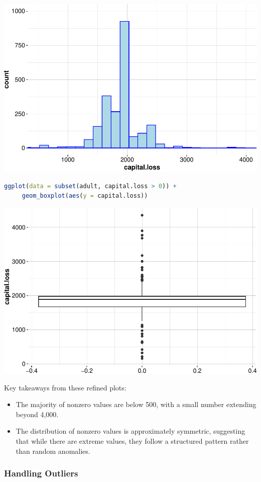 \documentclass[
]{book}
\providecommand{\tightlist}{%
  \setlength{\itemsep}{0pt}\setlength{\parskip}{0pt}}
\theoremstyle{definition}
\theoremstyle{definition}
\theoremstyle{definition}
\theoremstyle{definition}
\theoremstyle{remark}
\begin{document}
\begin{center}\includegraphics[width=0.7\linewidth]{data-preparation_files/figure-latex/unnamed-chunk-28-1} \end{center}

\begin{lstlisting}[language=R]
ggplot(data = subset(adult, capital.loss > 0)) +
     geom_boxplot(aes(y = capital.loss)) 
\end{lstlisting}

\begin{center}\includegraphics[width=0.7\linewidth]{data-preparation_files/figure-latex/unnamed-chunk-29-1} \end{center}

Key takeaways from these refined plots:

\begin{itemize}
\tightlist
\item
  The majority of nonzero values are below 500, with a small number extending beyond 4,000.\\
\item
  The distribution of nonzero values is approximately symmetric, suggesting that while there are extreme values, they follow a structured pattern rather than random anomalies.
\end{itemize}

\subsubsection*{Handling Outliers}\label{handling-outliers}
\end{document}
